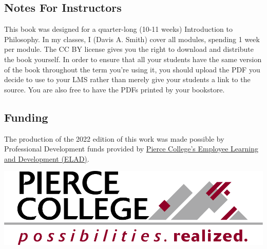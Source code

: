 \subsection{Notes For Instructors}

This book was designed for a quarter-long (10-11 weeks) Introduction to Philosophy. In my classes, I (Davis A. Smith) cover all modules, spending 1 week per module. The CC BY license gives you the right to download and distribute the book yourself. In order to ensure that all your students have the same version of the book throughout the term you’re using it, you should upload the PDF you decide to use to your LMS rather than merely give your students a link to the source. You are also free to have the PDFs printed by your bookstore.

\subsection{Funding}

The production of the 2022 edition of this work was made possible by Professional Development funds provided by \href{https://www.pierce.ctc.edu/elad}{Pierce College's Employee Learning and Development (ELAD)}. 


\includegraphics{marcom-PierceCollege-Logo.png}


\bigskip
